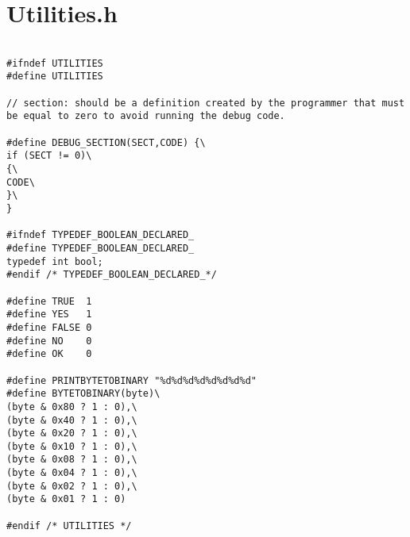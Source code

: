 \section{Utilities.h}
\label{UTILITIESH}

\begin{lstlisting}

#ifndef UTILITIES
#define UTILITIES

// section: should be a definition created by the programmer that must be equal to zero to avoid running the debug code.

#define DEBUG_SECTION(SECT,CODE) {\
if (SECT != 0)\
{\
CODE\
}\
}

#ifndef TYPEDEF_BOOLEAN_DECLARED_
#define TYPEDEF_BOOLEAN_DECLARED_
typedef int bool; 
#endif /* TYPEDEF_BOOLEAN_DECLARED_*/

#define TRUE  1
#define YES   1
#define FALSE 0
#define NO    0
#define OK    0

#define PRINTBYTETOBINARY "%d%d%d%d%d%d%d%d"
#define BYTETOBINARY(byte)\
(byte & 0x80 ? 1 : 0),\
(byte & 0x40 ? 1 : 0),\
(byte & 0x20 ? 1 : 0),\
(byte & 0x10 ? 1 : 0),\
(byte & 0x08 ? 1 : 0),\
(byte & 0x04 ? 1 : 0),\
(byte & 0x02 ? 1 : 0),\
(byte & 0x01 ? 1 : 0)

#endif /* UTILITIES */

\end{lstlisting}